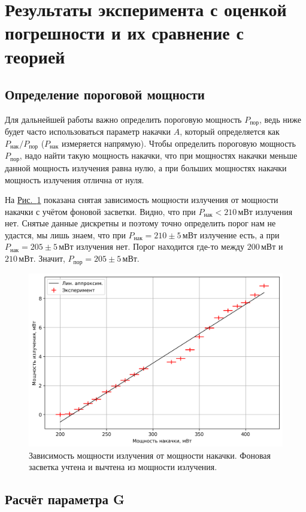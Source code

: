 \documentclass[12pt]{article}
\newcommand*{\figref}[2][]{\hyperref[#2]{Рис.~\ref*{#2}#1}}
\begin{document}
	\section{Результаты эксперимента с оценкой погрешности и их сравнение с теорией}

	\subsection{Определение пороговой мощности}

	Для дальнейшей работы важно определить пороговую мощность $P_\text{пор}$, ведь ниже будет часто использоваться параметр накачки $A$, который определяется как $P_\text{нак} / P_\text{пор}$ ($P_\text{нак}$ измеряется напрямую). Чтобы определить пороговую мощность $P_\text{пор}$, надо найти такую мощность накачки, что при мощностях накачки меньше данной мощность излучения равна нулю, а при больших мощностях накачки мощность излучения отлична от нуля.

	На \figref{fig:p_iz_vs_p_nak} показана снятая зависимость мощности излучения от мощности накачки с учётом фоновой засветки. Видно, что при $P_\text{нак}<210\,\text{мВт}$ излучения нет. Снятые данные дискретны и поэтому точно определить порог нам не удастся, мы лишь знаем, что при $P_\text{нак}=210\pm5\,\text{мВт}$ излучение есть, а при $P_\text{нак}=205\pm5\,\text{мВт}$ излучения нет. Порог находится где-то между $200\,\text{мВт}$ и $210\,\text{мВт}$. Значит, $P_\text{пор} = 205\pm5\,\text{мВт}.$

	\begin{figure}[tb]
		\centering
		\includegraphics[width=\textwidth]{../figures/p_iz_vs_p_nak.png}
		\caption{Зависимость мощности излучения от мощности накачки. Фоновая засветка учтена и вычтена из мощности излучения.}
		\label{fig:p_iz_vs_p_nak}
	\end{figure}

	\subsection{Расчёт параметра G}

	
\end{document}
